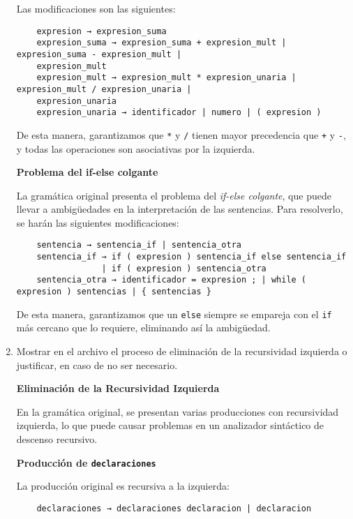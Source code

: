 \documentclass{article}
\begin{document}
\begin{enumerate}
    Las modificaciones son las siguientes:

    \begin{verbatim}
    expresion → expresion_suma
    expresion_suma → expresion_suma + expresion_mult | expresion_suma - expresion_mult | 
    expresion_mult
    expresion_mult → expresion_mult * expresion_unaria | expresion_mult / expresion_unaria | 
    expresion_unaria
    expresion_unaria → identificador | numero | ( expresion )
    \end{verbatim}

    De esta manera, garantizamos que \texttt{*} y \texttt{/} tienen mayor precedencia que \texttt{+} y \texttt{-}, y todas las operaciones son asociativas por la izquierda.

    \textbf{Problema del if-else colgante}

    La gramática original presenta el problema del \textit{if-else colgante}, que puede llevar a ambigüedades en la interpretación de las sentencias. Para resolverlo, se harán las siguientes modificaciones:

    \begin{verbatim}
    sentencia → sentencia_if | sentencia_otra
    sentencia_if → if ( expresion ) sentencia_if else sentencia_if 
                 | if ( expresion ) sentencia_otra
    sentencia_otra → identificador = expresion ; | while ( expresion ) sentencias | { sentencias }
    \end{verbatim}

    De esta manera, garantizamos que un \texttt{else} siempre se empareja con el \texttt{if} más cercano que lo requiere, eliminando así la ambigüedad.

    \item Mostrar en el archivo el proceso de eliminación de la recursividad izquierda o justificar, en caso de no ser necesario. 

    \textbf{Eliminación de la Recursividad Izquierda}

    En la gramática original, se presentan varias producciones con recursividad izquierda, lo que puede causar problemas en un analizador sintáctico de descenso recursivo. 

    \textbf{Producción de \texttt{declaraciones}}

    La producción original es recursiva a la izquierda:

    \begin{verbatim}
    declaraciones → declaraciones declaracion | declaracion
    \end{verbatim}


\end{enumerate}
\end{document}
